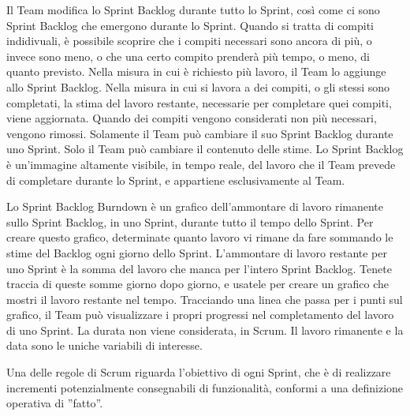 Il Team modifica lo Sprint Backlog durante tutto lo Sprint, cos\`i come ci sono Sprint Backlog che emergono durante lo Sprint. Quando si tratta di compiti indidivuali, \`e possibile scoprire che i compiti necessari sono ancora di pi\`u, o invece sono meno, o che una certo compito prender\`a pi\`u tempo, o meno, di quanto previsto. Nella misura in cui \`e richiesto pi\`u lavoro, il Team lo aggiunge allo Sprint Backlog. Nella misura in cui si lavora a dei compiti, o gli stessi sono completati, la stima del lavoro restante, necessarie per completare quei compiti, viene aggiornata.  Quando dei compiti vengono considerati non pi\`u necessari, vengono rimossi. Solamente il Team pu\`o cambiare il suo Sprint Backlog durante uno Sprint. Solo il Team pu\`o cambiare il contenuto delle stime. Lo Sprint Backlog \`e un'immagine altamente visibile, in tempo reale, del lavoro che il Team prevede di completare durante lo Sprint, e appartiene esclusivamente al Team.
\newline

Lo Sprint Backlog Burndown \`e un grafico dell'ammontare di lavoro rimanente sullo Sprint Backlog, in uno Sprint, durante tutto il tempo dello Sprint. Per creare questo grafico, determinate quanto lavoro vi rimane da fare sommando le stime del Backlog ogni giorno dello Sprint. L'ammontare di lavoro restante per uno Sprint \`e la somma del lavoro che manca per l'intero Sprint Backlog. Tenete traccia di queste somme giorno dopo giorno, e usatele per creare un grafico che mostri il lavoro restante nel tempo. Tracciando una linea che passa per i punti sul grafico, il Team pu\`o visualizzare i propri progressi nel completamento del lavoro di uno Sprint. La durata non viene considerata, in Scrum. Il lavoro rimanente e la data sono le uniche variabili di interesse. 
\newline


Una delle regole di Scrum riguarda l'obiettivo di ogni Sprint, che \`e di realizzare incrementi potenzialmente consegnabili di funzionalit\`a, conformi a una definizione operativa di  ''fatto''.


\subsection*{\color{Blue}{FATTO}}
\label{sec:done}

